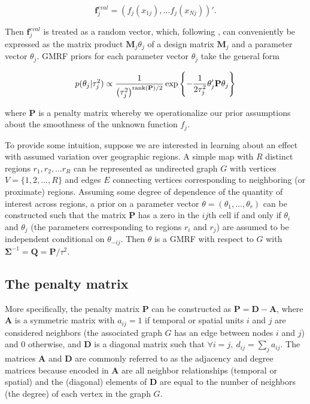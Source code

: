 \begin{equation*}
\mathbf{f}_j^{eval} = \left(f_j(x_{1j}), \dots f_j(x_{Nj})\right)'.  
 \end{equation*}
 
\noindent Then $\mathbf{f}_j^{eval}$ is treated as a random vector, which, following , can conveniently be expressed as the matrix product $\mathbf{M}_j \theta_j$ of a design matrix $\mathbf{M}_j$ and a parameter vector $\theta_j$. GMRF priors for each parameter vector $\theta_j$ take the general form

\begin{equation*}
p(\theta_j | \tau^2_j) 
\propto 
\frac{1}{\left(\tau^2_j\right)^{{\rm rank}(\mathbf{P})/2} }
\exp{\left\{-\frac{1}{2\tau^2_j} \theta_j' \mathbf{P} \theta_j\right\}}
\end{equation*}

\noindent where $\mathbf{P}$ is a penalty matrix whereby we operationalize our prior assumptions about the smoothness of the unknown function $f_j$. 

To provide some intuition, suppose we are interested in learning about an effect with assumed variation over geographic regions.  A simple map with $R$ distinct regions $r_1, r_2, \dots r_R$ can be represented as undirected graph $G$ with vertices $V = \{1, 2, \dots, R\}$ and edges $E$ connecting vertices corresponding to neighboring (or proximate) regions. Assuming some degree of dependence of the quantity of interest across regions, a prior on a parameter vector $\theta = (\theta_1, \dots, \theta_r)$ can be constructed such that the matrix $\mathbf{P}$ has a zero in the $ij$th cell if and only if $\theta_i$ and $\theta_j$ (the parameters corresponding to regions $r_i$ and $r_j$) are assumed to be independent conditional on $\theta_{-ij}$. Then $\theta$ is a GMRF with respect to $G$ with $\boldsymbol{\Sigma}^{-1} = \mathbf{Q} = \mathbf{P}/\tau^2$. 

\subsection{The penalty matrix} 
\label{penalty_matrix}

More specifically, the penalty matrix $\mathbf{P}$ can be constructed as  $\mathbf{P} = \mathbf{D} - \mathbf{A}$, where $\mathbf{A}$ is a symmetric matrix with $a_{ij} = 1$ if temporal or spatial units $i$ and $j$ are considered neighbors (the associated graph $G$ has an edge between nodes $i$ and $j$) and 0 otherwise, and $\mathbf{D}$ is a diagonal matrix such that $\forall i = j, \: d_{ij} = \sum_j a_{ij}$. The matrices $\mathbf{A}$ and $\mathbf{D}$ are commonly referred to as the adjacency and degree matrices because encoded in $\mathbf{A}$ are all neighbor relationships (temporal or spatial) and the (diagonal) elements of $\mathbf{D}$ are equal to the number of neighbors (the degree) of each vertex in the graph $G$. 

